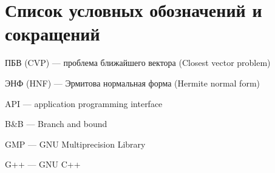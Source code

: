 \newpage

\section{Список условных обозначений и сокращений}

ПБВ (CVP) --- проблема ближайшего вектора (Closest vector problem)

ЭНФ (HNF) --- Эрмитова нормальная форма (Hermite normal form)

API --- application programming interface

B\&B --- Branch and bound

GMP --- GNU Multiprecision Library

G++ --- GNU C++


\clearpage